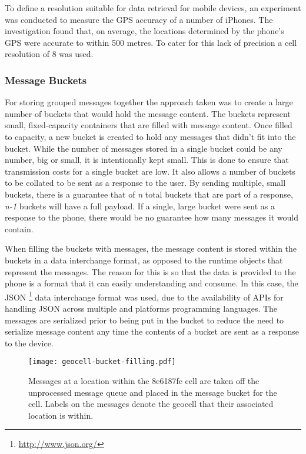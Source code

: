 \documentclass{article}
\begin{document}
To define a resolution suitable for data retrieval for mobile devices, an experiment was conducted to measure the GPS accuracy of a number of iPhones. The investigation found that, on average, the locations determined by the phone's GPS were accurate to within 500 metres. To cater for this lack of precision a cell resolution of 8 was used.

\subsubsection{Message Buckets} %

For storing grouped messages together the approach taken was to create a large number of buckets that would hold the message content. The buckets represent small, fixed-capacity containers that are filled with message content. Once filled to capacity, a new bucket is created to hold any messages that didn't fit into the bucket. While the number of messages stored in a single bucket could be any number, big or small, it is intentionally kept small. This is done to ensure that transmission costs for a single bucket are low. It also allows a number of buckets to be collated to be sent as a response to the user. By sending multiple, small buckets, there is a guarantee that of \emph{n} total buckets that are part of a response, \emph{n-1} buckets will have a full payload. If a single, large bucket were sent as a response to the phone, there would be no guarantee how many messages it would contain. 

When filling the buckets with messages, the message content is stored within the buckets in a data interchange format, as opposed to the runtime objects that represent the messages. The reason for this is so that the data is provided to the phone is a format that it can easily understanding and consume. In this case, the JSON \footnote{\url{http://www.json.org/}} data interchange format was used, due to the availability of APIs for handling JSON across multiple and platforms programming languages. The messages are serialized prior to being put in the bucket to reduce the need to serialize message content any time the contents of a bucket are sent as a response to the device.

\begin{figure}
\begin{center}
\texttt{[image: geocell-bucket-filling.pdf]}
\caption{Messages at a location within the 8e6187fe cell are taken off the unprocessed message queue and placed in the message bucket for the cell. Labels on the messages denote the geocell that their associated location is within.}
\label{fig:geocell_bucket_filling}
\end{center}
\end{figure}
\end{document}
